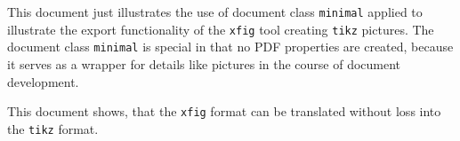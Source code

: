 \documentclass{minimal}
\newcommand{\inputNoChk}[1]{} %
\begin{document}
This document just illustrates the use of document class \texttt{minimal} 
applied to illustrate the export functionality of the \texttt{xfig} tool 
creating \texttt{tikz} pictures. 
The document class \texttt{minimal} is special in that no PDF properties are created, 
because it serves as a wrapper for details like pictures in the course of document development. 

This document shows, that the \texttt{xfig} format 
can be translated without loss into the \texttt{tikz} format. 

\begin{center}
  \resizebox{0.5\textwidth}{!}{\inputNoChk{example.tikz}}
\end{center}
\end{document}
